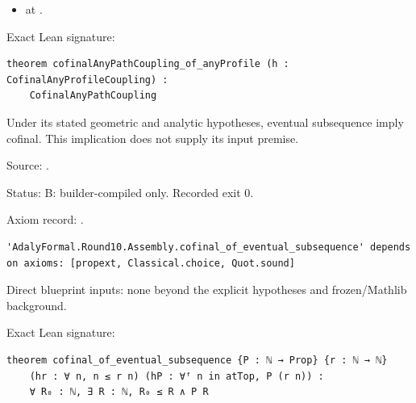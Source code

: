 \begin{theorem}[bp-318]
\begin{itemize}
\item \texttt{} at \texttt{}.
\end{itemize}
\par Exact Lean signature:
\begin{verbatim}
theorem cofinalAnyPathCoupling_of_anyProfile (h : CofinalAnyProfileCoupling) :
    CofinalAnyPathCoupling
\end{verbatim}
\end{theorem}

\begin{theorem}[bp-319]
\label{bp-319}
\uses{}
\leanok
Under its stated geometric and analytic hypotheses, eventual subsequence imply cofinal. This implication does not supply its input premise.

\par Source: \texttt{}.
\par Status: B: builder-compiled only. Recorded exit 0.
\par Axiom record: \texttt{}.
\begin{verbatim}
'AdalyFormal.Round10.Assembly.cofinal_of_eventual_subsequence' depends on axioms: [propext, Classical.choice, Quot.sound]
\end{verbatim}
\par Direct blueprint inputs: none beyond the explicit hypotheses and frozen/Mathlib background.
\par Exact Lean signature:
\begin{verbatim}
theorem cofinal_of_eventual_subsequence {P : ℕ → Prop} {r : ℕ → ℕ}
    (hr : ∀ n, n ≤ r n) (hP : ∀ᶠ n in atTop, P (r n)) :
    ∀ R₀ : ℕ, ∃ R : ℕ, R₀ ≤ R ∧ P R
\end{verbatim}
\end{theorem}

